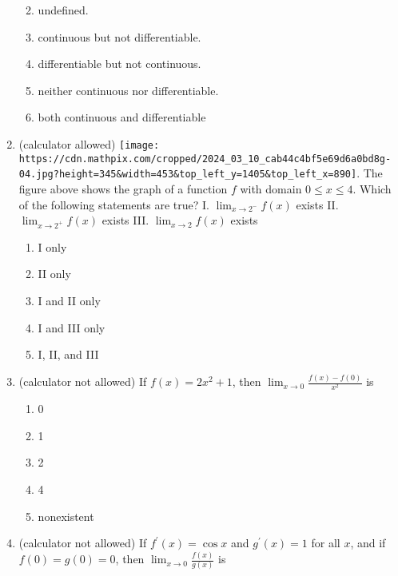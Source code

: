 \documentclass[
]{article}
\providecommand{\tightlist}{%
  \setlength{\itemsep}{0pt}\setlength{\parskip}{0pt}}
\begin{document}
\begin{enumerate}
  \begin{enumerate}
  \def\labelenumii{(\alph{enumii})}
  \tightlist
  \item
    undefined.
  \item
    continuous but not differentiable.
  \item
    differentiable but not continuous.
  \item
    neither continuous nor differentiable.
  \item
    both continuous and differentiable
  \end{enumerate}
\item
  (calculator allowed)
  \texttt{[image: https://cdn.mathpix.com/cropped/2024\_03\_10\_cab44c4bf5e69d6a0bd8g-04.jpg?height=345\&width=453\&top\_left\_y=1405\&top\_left\_x=890]}.
  The figure above shows the graph of a function \(f\) with domain
  \(0 \leq x \leq 4\). Which of the following statements are true? I.
  \(\lim _{x \rightarrow 2^{-}} f(x)\) exists II.
  \(\lim _{x \rightarrow 2^{+}} f(x)\) exists III.
  \(\lim _{x \rightarrow 2} f(x)\) exists

  \begin{enumerate}
  \def\labelenumii{(\alph{enumii})}
  \tightlist
  \item
    I only
  \item
    II only
  \item
    I and II only
  \item
    I and III only
  \item
    I, II, and III
  \end{enumerate}
\item
  (calculator not allowed) If \(f(x)=2 x^{2}+1\), then
  \(\lim _{x \rightarrow 0} \frac{f(x)-f(0)}{x^{2}}\) is

  \begin{enumerate}
  \def\labelenumii{(\alph{enumii})}
  \tightlist
  \item
    0
  \item
    1
  \item
    2
  \item
    4
  \item
    nonexistent
  \end{enumerate}
\item
  (calculator not allowed) If \(f^{\prime}(x)=\cos x\) and
  \(g^{\prime}(x)=1\) for all \(x\), and if \(f(0)=g(0)=0\), then
  \(\lim _{x \rightarrow 0} \frac{f(x)}{g(x)}\) is


\end{enumerate}
\end{document}
